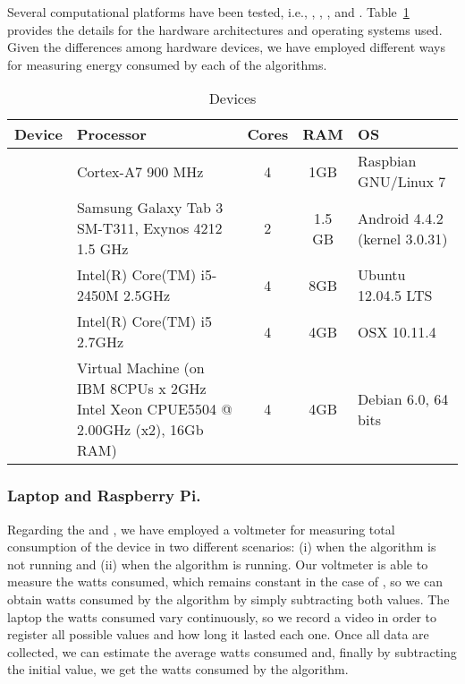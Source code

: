 Several computational platforms have been tested, i.e., \raspberrynsp, \tabletnsp, \laptopnsp, \iMac and \bladensp.  Table~\ref{Table:devices} provides the details for the hardware architectures and operating systems used. Given the differences among hardware devices, we have employed different ways  %
for measuring energy consumed by each of the algorithms.  

\begin{table}[!t]
\centering
\caption{Devices}
\label{Table:devices}
\begin{tabular}{lp{4.5cm}ccp{3cm}} \hline
Device		&	Processor			&	Cores	&	RAM &	OS		\\ 
\hline
\raspberry   	& Cortex-A7 900 MHz			&	 4 	&	1GB &	Raspbian GNU/Linux 7	\\
\tablet		& Samsung Galaxy Tab 3 SM-T311, Exynos 4212 1.5 GHz& 2  & 1.5 GB &	Android	4.4.2 (kernel 3.0.31) \\
\laptop 		& Intel(R) Core(TM) i5-2450M 2.5GHz	&	4	&	8GB &	Ubuntu 12.04.5 LTS \\
\iMac		& Intel(R) Core(TM) i5 2.7GHz	& 4	& 4GB 	&OSX 10.11.4			\\
\blade		& Virtual Machine (on IBM 8CPUs x 2GHz Intel Xeon CPUE5504 @ 2.00GHz (x2), 16Gb RAM) & 4 & 4GB & Debian 6.0, 64 bits\\
\hline
\end{tabular}
\end{table}


\subsubsection*{Laptop and Raspberry Pi.}
Regarding the \laptop and \raspberrynsp, we have employed a voltmeter for measuring total consumption of the device in two different scenarios:  (i) when the algorithm is 
not running and (ii) when the algorithm is running.  Our voltmeter is able to measure the watts consumed, which remains constant in the case of \raspberrynsp, so we can 
obtain watts consumed by the algorithm by simply subtracting both values. The laptop the watts consumed vary continuously, so we record a video in order to 
register all possible values and how long it lasted each one. Once all data are collected, we can estimate the average watts consumed and, finally by subtracting the 
initial value, we get the watts consumed by the algorithm.

